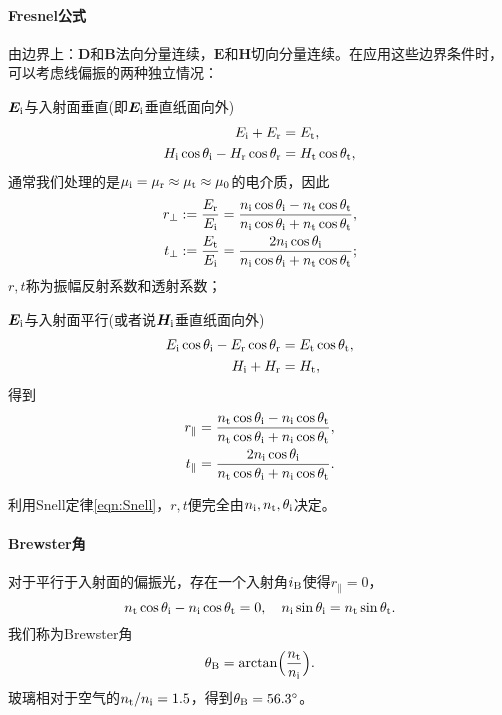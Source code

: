 \paragraph{Fresnel公式}
由边界上：$\bm D$和$\bm B$法向分量连续，$\bm E$和$\bm H$切向分量连续。在应用这些边界条件时，可以考虑线偏振的两种独立情况：
\begin{compactenum}
	\item $\bm E_{\mathrm{i}}$与入射面垂直(即$\bm E_{\mathrm{i}}$垂直纸面向外)%
	\begin{align*}
        E_{\mathrm{i}}+E_\text r&=E_\text t,\\
        H_{\mathrm{i}}\cos\theta_{\mathrm{i}}-H_\text r\cos\theta_\text r&=H_\text t\cos\theta_\text t,
    \end{align*}
    通常我们处理的是$\mu_{\mathrm{i}}=\mu_\text r\approx\mu_\text t\approx\mu_0$的电介质，因此
    \begin{align}
        \label{eqn:Fresnel rperp}
        r_\perp:=\frac{E_\text r}{E_{\mathrm{i}}}=\frac{n_{\mathrm{i}}\cos\theta_{\mathrm{i}}-n_\text t\cos\theta_\text t}{n_{\mathrm{i}}\cos\theta_{\mathrm{i}}+n_\text t\cos\theta_\text t},\\
        \label{eqn:Fresnel tperp}
        t_\perp:=\frac{E_\text t}{E_{\mathrm{i}}}=\frac{2n_{\mathrm{i}}\cos\theta_{\mathrm{i}}}{n_{\mathrm{i}}\cos\theta_{\mathrm{i}}+n_\text t\cos\theta_\text t};
    \end{align}
    $r,t$称为振幅反射系数和透射系数；
	\item $\bm E_{\mathrm{i}}$与入射面平行(或者说$\bm H_{\mathrm{i}}$垂直纸面向外)
	\begin{align*}
        E_{\mathrm{i}}\cos\theta_{\mathrm{i}}-E_\text r\cos\theta_\text r&=E_\text t\cos\theta_\text t,\\
        H_{\mathrm{i}}+H_\text r&=H_\text t,
    \end{align*}
    得到 
    \begin{align}
        \label{eqn:Fresnel rpara}
        r_\parallel&=\frac{n_\text t\cos\theta_{\mathrm{i}}-n_{\mathrm{i}}\cos\theta_\text t}{n_\text t\cos\theta_{\mathrm{i}}+n_{\mathrm{i}}\cos\theta_\text t},\\
        \label{eqn:Fresnel tpara}
        t_\parallel&=\frac{2n_{\mathrm{i}}\cos\theta_{\mathrm{i}}}{n_\text t\cos\theta_{\mathrm{i}}+n_{\mathrm{i}}\cos\theta_\text t}.
    \end{align}
\end{compactenum}
利用Snell定律\eqref{eqn:Snell}，$r,t$便完全由$n_{\mathrm{i}},n_\text t,\theta_{\mathrm{i}}$决定。
\paragraph{Brewster角}
对于平行于入射面的偏振光，存在一个入射角$i_\text B$使得$r_\parallel=0$，%
\[
    n_\text t\cos\theta_{\mathrm{i}}-n_{\mathrm{i}}\cos\theta_\text t=0,\quad n_{\mathrm{i}}\sin\theta_{\mathrm{i}}=n_\text t\sin\theta_\text t.
\]
我们称为Brewster角
\begin{equation}
    \label{eqn:Brewster}
    \theta_\text B=\arctan\Bigl(\frac{n_\text t}{n_{\mathrm{i}}}\Bigr).
\end{equation}
玻璃相对于空气的$n_\text t/n_{\mathrm{i}}=1.5$，得到$\theta_\text B=56.3^\circ$。
